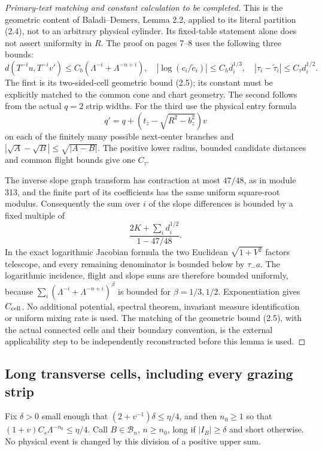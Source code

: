 \begin{proof}[Primary-text matching and constant calculation to be completed]
This is the geometric content of Baladi--Demers, Lemma 2.2, applied
to its literal partition (2.4), not to an arbitrary physical cylinder.
Its fixed-table statement alone does not assert uniformity in $R$.
The proof on pages 7--8 uses the following three bounds:
\[
 d(T^{-i}u,T^{-i}v')
   \le C_b(\Lambda^{-i}+\Lambda^{-n+i}),\quad
 |\log(c_i/\widetilde c_i)|
       \le C_h d_i^{1/3},\quad
 |\tau_i-\widetilde\tau_i|\le C_\tau d_i^{1/2}.
\]
The first is its two-sided-cell geometric bound (2.5); its constant
must be explicitly matched to the common cone and chart geometry.
The second follows from the actual $q=2$ strip widths.
For the third use the physical entry formula
\[
 q'=q+(t_z-\sqrt{R^2-b_z^2})v
\]
on each of the finitely many possible next-center branches and
$|\sqrt A-\sqrt B|\le\sqrt{|A-B|}$.
The positive lower radius, bounded candidate distances and common
flight bounds give one $C_\tau$.

The inverse slope graph transform has contraction at most $47/48$,
as in module 313, and the finite part of its coefficients has the
same uniform square-root modulus.
Consequently the sum over $i$ of the slope differences is bounded
by a fixed multiple of
\[
 \frac{2K+\sum_i d_i^{1/2}}{1-47/48}.
\]
In the exact logarithmic Jacobian formula the two Euclidean
$\sqrt{1+V^2}$ factors telescope, and every remaining denominator
is bounded below by $\tau_-a$.
The logarithmic incidence, flight and slope sums are therefore
bounded uniformly, because
$\sum_i(\Lambda^{-i}+\Lambda^{-n+i})^\beta$ is bounded
for $\beta=1/3,1/2$.
Exponentiation gives $C_{\rm cell}$.
No additional potential, spectral theorem, invariant measure
identification or uniform mixing rate is used.
The matching of the geometric bound (2.5), with the actual connected
cells and their boundary convention, is the external applicability
step to be independently reconstructed before this lemma is used.
\end{proof}

\subsection{Long transverse cells, including every grazing strip}

Fix $\delta>0$ small enough that
$(2+v^{-1})\delta\le\eta/4$, and then $n_0\ge1$ so that
$(1+v)C_s\Lambda^{-n_0}\le\eta/4$.
Call $B\in\mathcal B_n$, $n\ge n_0$, long if $|I_B|\ge\delta$ and
short otherwise.
No physical event is changed by this division of a positive upper sum.

